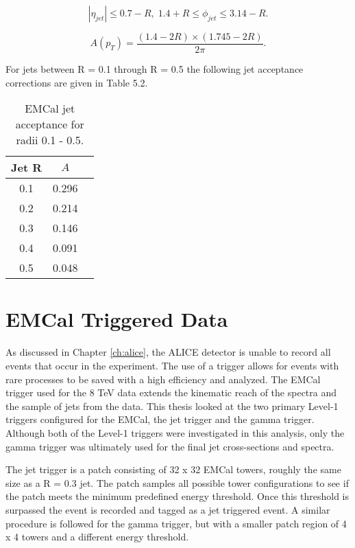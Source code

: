 \begin{equation}
|\eta_{jet}| \leq 0.7 - R, \; 1.4 + R \leq \phi_{jet} \leq 3.14 -R.
\label{eq:jetconstration}
\end{equation}

\begin{equation}
A(p_{T}) = \frac{(1.4 - 2R) \times (1.745 - 2R)}{2 \pi}.
\label{eq:acceptance}
\end{equation}

For jets between R = 0.1 through R = 0.5 the following jet acceptance corrections are given in Table 5.2.

\begin{table}[hb]
\label{tab:AcceptanceFactor}
\begin{center}
\caption{EMCal jet acceptance for radii 0.1 - 0.5.}
\begin{tabular}[b]{|c|c|c|}
	\hline
	Jet R & $ A $ \\ \hline
	0.1 & 0.296 \\ \hline
	0.2 & 0.214\\ \hline
	0.3 & 0.146\\ \hline
	0.4 & 0.091\\ \hline
	0.5 & 0.048\\ \hline
\end{tabular}
\end{center}

\end{table}

\section{EMCal Triggered Data}

As discussed in Chapter \ref{ch:alice}, the ALICE detector is unable to record all events that occur in the experiment.   The use of a trigger allows for events with rare processes to be saved with a high efficiency and analyzed.  The EMCal trigger used for the 8 TeV data extends the kinematic reach of the spectra and the sample of jets from the data.  This thesis looked at the two primary Level-1 triggers configured for the EMCal, the jet trigger and the gamma trigger\cite{Bourrion:2010js}.  Although both of the Level-1 triggers were investigated in this analysis, only the gamma trigger was ultimately used for the final jet cross-sections and spectra.  

The jet trigger is a patch consisting of 32 x 32 EMCal towers, roughly the same size as a R = 0.3 jet.  The patch samples all possible tower configurations to see if the patch meets the minimum predefined energy threshold.  Once this threshold is surpassed the event is recorded and tagged as a jet triggered event.  A similar procedure is followed for the gamma trigger, but with a smaller patch region of 4 x 4 towers and a different energy threshold.  

